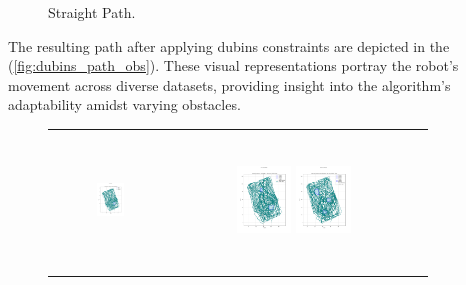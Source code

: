 \begin{figure}[]
\begin{tabular}{ccc}
    \end{tabular}
    \caption{Straight Path.\label{fig:straight_path_obs}}
\end{figure}


\vspace{3mm}

The resulting path after applying dubins constraints are depicted in the (\autoref{fig:dubins_path_obs}). These visual representations portray the robot's movement across diverse datasets, providing insight into the algorithm's adaptability amidst varying obstacles. 



\begin{figure}[htbp]
    \centering
    \begin{tabular}{ccc} 
         \includegraphics[height=36mm,width=0.24\textwidth]{Images/simulation_obs/obs_dubins/1.png}
        & \includegraphics[height=36mm,width=0.24\textwidth]{Images/simulation_obs/obs_dubins/2.png}
         \includegraphics[height=36mm,width=0.24\textwidth]{Images/simulation_obs/obs_dubins/3.png}\\[-4pt]


\end{tabular}
\end{figure}

